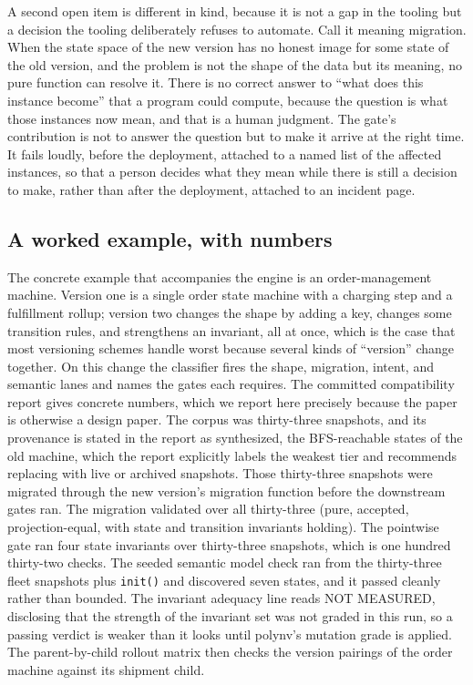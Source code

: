 \documentclass[11pt]{article}
\newcommand{\tool}[1]{\textsf{#1}}
\newcommand{\code}[1]{\texttt{#1}}
\begin{document}
A second open item is different in kind, because it is not a gap in the tooling
but a decision the tooling deliberately refuses to automate. Call it meaning
migration. When the state space of the new version has no honest image for some
state of the old version, and the problem is not the shape of the data but its
meaning, no pure function can resolve it. There is no correct answer to ``what
does this instance become'' that a program could compute, because the question
is what those instances now mean, and that is a human judgment. The gate's
contribution is not to answer the question but to make it arrive at the right
time. It fails loudly, before the deployment, attached to a named list of the
affected instances, so that a person decides what they mean while there is still
a decision to make, rather than after the deployment, attached to an incident
page.

\subsection{A worked example, with numbers}

The concrete example that accompanies the engine is an order-management
machine. Version one is a single order state machine with a charging step and a
fulfillment rollup; version two changes the shape by adding a key, changes some
transition rules, and strengthens an invariant, all at once, which is the case
that most versioning schemes handle worst because several kinds of ``version''
change together. On this change the classifier fires the shape, migration,
intent, and semantic lanes and names the gates each requires. The committed
compatibility report gives concrete numbers, which we report here precisely
because the paper is otherwise a design paper. The corpus was thirty-three
snapshots, and its provenance is stated in the report as synthesized, the
BFS-reachable states of the old machine, which the report explicitly labels the
weakest tier and recommends replacing with live or archived snapshots. Those
thirty-three snapshots were migrated through the new version's migration function
before the downstream gates ran. The migration validated over all thirty-three
(pure, accepted, projection-equal, with state and transition invariants holding).
The pointwise gate ran four state invariants over thirty-three snapshots, which
is one hundred thirty-two checks. The seeded semantic model check ran from the
thirty-three fleet snapshots plus \code{init()} and discovered seven states, and
it passed cleanly rather than bounded. The invariant adequacy line reads NOT
MEASURED, disclosing that the strength of the invariant set was not graded in
this run, so a passing verdict is weaker than it looks until \tool{polynv}'s
mutation grade is applied. The parent-by-child rollout matrix then checks the
version pairings of the order machine against its shipment child.
\end{document}
